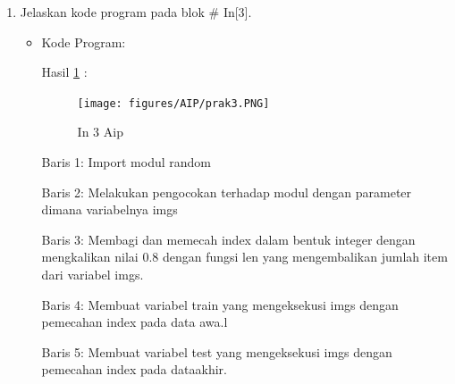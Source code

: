 \begin{enumerate}
\item Jelaskan kode program pada blok \# In[3].
\begin{itemize}
\item Kode Program:

\par Hasil \ref{in3aip} :
\begin{figure}[!hbtp]
\centering
\texttt{[image: figures/AIP/prak3.PNG]}
\caption{In 3 Aip}
\label{in3aip}
\end{figure}
\par Baris 1: Import modul random
\par Baris 2: Melakukan pengocokan terhadap modul dengan parameter dimana variabelnya imgs
\par Baris 3: Membagi dan memecah index dalam bentuk integer dengan mengkalikan nilai 0.8 dengan fungsi len yang mengembalikan jumlah item dari variabel imgs.
\par Baris 4: Membuat variabel train yang mengeksekusi imgs dengan pemecahan index pada data awa.l
\par Baris 5: Membuat variabel test yang mengeksekusi imgs dengan pemecahan index pada dataakhir.

\end{itemize}
\par


\end{enumerate}
